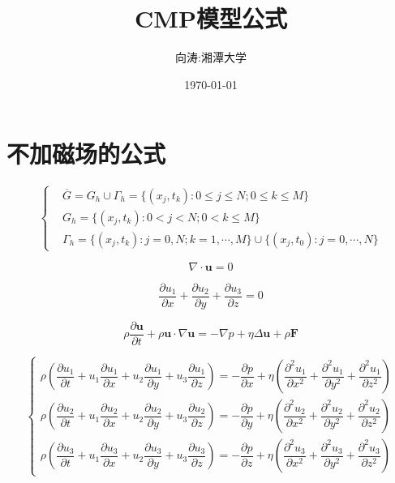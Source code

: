 \documentclass[UTF8]{ctexart}
\title{CMP模型公式}
\author{向涛:湘潭大学}
\date{\today}
\begin{document}
\maketitle

\section{不加磁场的公式}

\begin{equation}
\left \{
\begin{aligned}
& \overline{G}=G_h \cup \Gamma_h=\{ (x_j,t_k):0\leq j\leq N;0\leq k \leq M \}　\\
& G_h = \{ (x_j,t_k):0<j<N;0<k\leq M \} \\
& \Gamma_h=\{ (x_j,t_k):j=0,N;k=1,\cdots,M \} \cup \{  (x_j,t_0):j=0,\cdots,N \}
\end{aligned}
\right.
\end{equation}

\begin{equation}
\nabla\cdot\pmb{u} = 0
\end{equation}

\begin{equation}
\dfrac{\partial u_1}{\partial x} 
+ \dfrac{\partial u_2}{\partial y} 
+ \dfrac{\partial u_3}{\partial z}=0
\end{equation}

\begin{equation}
\rho\dfrac{\partial \pmb{u}}{\partial t}
+ \rho\pmb{u}\cdot\nabla \pmb{u}
= -\nabla p+ \eta\Delta \pmb{u} +\rho\pmb{F}
\end{equation}

\begin{equation}
\left \{
\begin{aligned}
\rho \left(\dfrac{\partial u_1}{\partial t}
+u_1 \dfrac{\partial u_1}{\partial x}
+u_2 \dfrac{\partial u_1}{\partial y}
+u_3 \dfrac{\partial u_1}{\partial z}\right)
= -\dfrac{\partial p}{\partial x} + \eta
\left( \dfrac{\partial^2 u_1}{\partial x^2} + \dfrac{\partial^2 u_1}{\partial y^2}
+\dfrac{\partial^2 u_1}{\partial z^2}  \right) \\
\rho \left(\dfrac{\partial u_2}{\partial t}
+u_1 \dfrac{\partial u_2}{\partial x}
+u_2 \dfrac{\partial u_2}{\partial y}
+u_3 \dfrac{\partial u_2}{\partial z}\right)
= -\dfrac{\partial p}{\partial y} + \eta
\left( \dfrac{\partial^2 u_2}{\partial x^2} + \dfrac{\partial^2 u_2}{\partial y^2}
+\dfrac{\partial^2 u_2}{\partial z^2}  \right)\\
\rho \left(\dfrac{\partial u_3}{\partial t}
+u_1 \dfrac{\partial u_3}{\partial x}
+u_2 \dfrac{\partial u_3}{\partial y}
+u_3 \dfrac{\partial u_3}{\partial z}\right)
= -\dfrac{\partial p}{\partial z} + \eta
\left( \dfrac{\partial^2 u_3}{\partial x^2} + \dfrac{\partial^2 u_3}{\partial y^2}
+\dfrac{\partial^2 u_3}{\partial z^2}  \right)
\end{aligned}
\right.
\end{equation}
\end{document}
